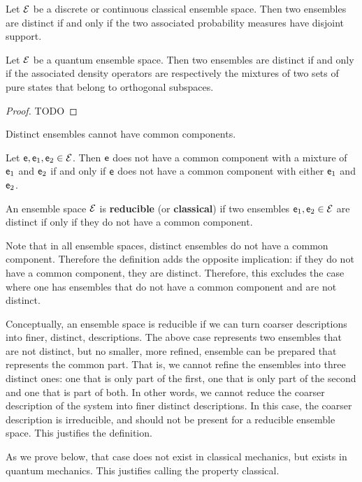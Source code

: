 \begin{prop}
	Let $\mathcal{E}$ be a discrete or continuous classical ensemble space. Then two ensembles are distinct if and only if the two associated probability measures have disjoint support.
	
	Let $\mathcal{E}$ be a quantum ensemble space. Then two ensembles are distinct if and only if the associated density operators are respectively the mixtures of two sets of pure states that belong to orthogonal subspaces.
\end{prop}

\begin{proof}
	TODO
\end{proof}

\begin{conj}
	Distinct ensembles cannot have common components.
\end{conj}

\begin{conj}
	Let $\mathsf{e},\mathsf{e}_1,\mathsf{e}_2 \in \mathcal{E}$. Then $\mathsf{e}$ does not have a common component with a mixture of $\mathsf{e}_1$ and $\mathsf{e}_2$ if and only if $\mathsf{e}$ does not have a common component with either $\mathsf{e}_1$ and $\mathsf{e}_2$.
\end{conj}

\begin{defn}
	An ensemble space $\mathcal{E}$ is \textbf{reducible} (or \textbf{classical}) if two ensembles $\mathsf{e}_1, \mathsf{e}_2 \in \mathcal{E}$ are distinct if only if they do not have a common component.
\end{defn}

\begin{justification}
	Note that in all ensemble spaces, distinct ensembles do not have a common component. Therefore the definition adds the opposite implication: if they do not have a common component, they are distinct. Therefore, this excludes the case where one has ensembles that do not have a common component and are not distinct.
	
	Conceptually, an ensemble space is reducible if we can turn coarser descriptions into finer, distinct, descriptions. The above case represents two ensembles that are not distinct, but no smaller, more refined, ensemble can be prepared that represents the common part. That is, we cannot refine the ensembles into three distinct ones: one that is only part of the first, one that is only part of the second and one that is part of both. In other words, we cannot reduce the coarser description of the system into finer distinct descriptions. In this case, the coarser description is irreducible, and should not be present for a reducible ensemble space. This justifies the definition.
	
	As we prove below, that case does not exist in classical mechanics, but exists in quantum mechanics. This justifies calling the property classical.
\end{justification}

